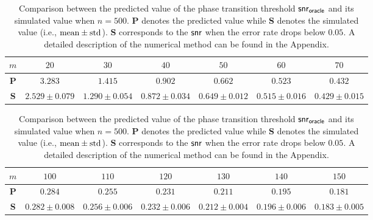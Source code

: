 \documentclass[11pt]{article}
\def \oracle{\mathsf{oracle}}
\begin{document}
\begin{table}[!h]
\centering
\caption{
Comparison between the predicted value
of the phase transition threshold $\snr_{\oracle}$ and
its simulated value when $n = 500$.
\textbf{P} denotes the predicted value while
\textbf{S}  denotes the simulated value (i.e., $\textup{mean}\pm \textup{std}$).
\textbf{S}  corresponds to
the $\mathsf{snr}$ when the error rate drops below $0.05$. A detailed description of the numerical method can be found in the Appendix.
\vspace{0.1in}}
\label{tab:snr_threshold}
\begin{tabular}{@{}c|cccccc@{}}\toprule
$m$  & $20$ & $30$ & $40$ & $50$ & $60$
&  $70$   \\
\midrule
\textbf{P} & $3.283$ & $1.415$ & $0.902$ & $0.662$ & $0.523$
&   $0.432$  \\
\textbf{S} & $2.529\pm 0.079$ & $1.290\pm 0.054$ & $0.872\pm 0.034$ & $0.649\pm 0.012$ & $0.515 \pm 0.016$ &
$0.429 \pm 0.015$ \\
\bottomrule
\end{tabular}
\vspace{0.1in}
\begin{tabular}{@{}c|cccccc@{}}\toprule
$m$  & $100$ & $110$ & $120$ & $130$ & $140$
&  $150$   \\
\midrule
\textbf{P} & $0.284$ & $0.255$ & $0.231$ & $0.211$ & $0.195$
&   $0.181$  \\
\textbf{S} & $0.282\pm 0.008$ & $0.256\pm 0.006$ & $0.232\pm 0.006$ & $0.212\pm 0.004$ & $0.196 \pm 0.006$ &
$0.183 \pm 0.005$ \\
\bottomrule
\end{tabular}%
\end{table}



\end{document}
